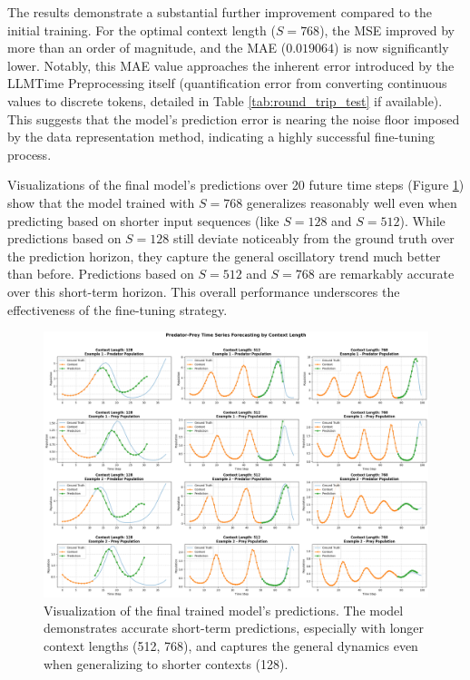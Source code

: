 \documentclass{article}
\begin{document}
The results demonstrate a substantial further improvement compared to the initial training. For the optimal context length ($S=768$), the MSE improved by more than an order of magnitude, and the MAE ($0.019064$) is now significantly lower. Notably, this MAE value approaches the inherent error introduced by the LLMTime Preprocessing  itself (quantification error from converting continuous values to discrete tokens, detailed in Table \ref{tab:round_trip_test} if available). This suggests that the model's prediction error is nearing the noise floor imposed by the data representation method, indicating a highly successful fine-tuning process.

Visualizations of the final model's predictions over 20 future time steps (Figure \ref{fig:final_training_predictions}) show that the model trained with $S=768$ generalizes reasonably well even when predicting based on shorter input sequences (like $S=128$ and $S=512$). While predictions based on $S=128$ still deviate noticeably from the ground truth over the prediction horizon, they capture the general oscillatory trend much better than before. Predictions based on $S=512$ and $S=768$ are remarkably accurate over this short-term horizon. This overall performance underscores the effectiveness of the fine-tuning strategy.

\begin{figure}[!htbp] 
    \centering
    \includegraphics[width=0.8\linewidth]{M2 Course Work//Images/final_training_result.png}
    \caption{Visualization of the final trained model's predictions. The model demonstrates accurate short-term predictions, especially with longer context lengths (512, 768), and captures the general dynamics even when generalizing to shorter contexts (128).}
    \label{fig:final_training_predictions} %
\end{figure}
\end{document}

